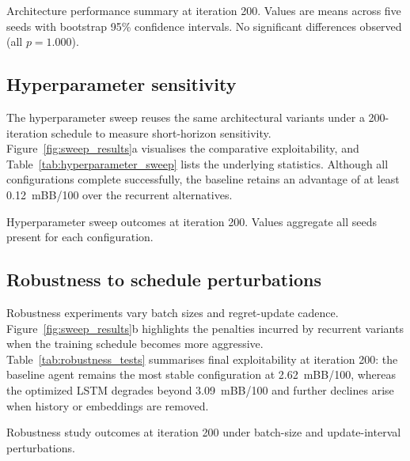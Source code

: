 \documentclass[10pt,twocolumn]{article}
\theoremstyle{definition}
\begin{document}
\begin{table}[t]
    \centering
    \caption{Architecture performance summary at iteration 200. Values are means across five seeds with bootstrap 95\% confidence intervals. No significant differences observed (all $p = 1.000$).}
    \label{tab:architecture_results}
    
\end{table}

\subsection{Hyperparameter sensitivity}

The hyperparameter sweep reuses the same architectural variants under a 200-iteration schedule to measure short-horizon sensitivity. Figure~\ref{fig:sweep_results}a visualises the comparative exploitability, and Table~\ref{tab:hyperparameter_sweep} lists the underlying statistics. Although all configurations complete successfully, the baseline retains an advantage of at least 0.12~mBB/100 over the recurrent alternatives.

\begin{table}[t]
    \centering
    \caption{Hyperparameter sweep outcomes at iteration 200. Values aggregate all seeds present for each configuration.}
    \label{tab:hyperparameter_sweep}
    
\end{table}

\subsection{Robustness to schedule perturbations}

Robustness experiments vary batch sizes and regret-update cadence. Figure~\ref{fig:sweep_results}b highlights the penalties incurred by recurrent variants when the training schedule becomes more aggressive. Table~\ref{tab:robustness_tests} summarises final exploitability at iteration 200: the baseline agent remains the most stable configuration at 2.62~mBB/100, whereas the optimized LSTM degrades beyond 3.09~mBB/100 and further declines arise when history or embeddings are removed.

\begin{table}[t]
    \centering
    \caption{Robustness study outcomes at iteration 200 under batch-size and update-interval perturbations.}
    \label{tab:robustness_tests}
    
\end{table}
\end{document}
